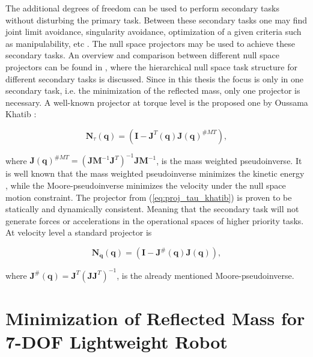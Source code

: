 The additional degrees of freedom can be used to perform secondary tasks without disturbing the primary task. Between these secondary tasks one may find joint limit avoidance, singularity avoidance, optimization of a given criteria such as manipulability, etc  \cite{redundancy_1}. 
The null space projectors may be used to achieve these secondary tasks. An overview and comparison between different null space projectors can be found in \cite{JLA_5}, where the hierarchical null space task structure for different secondary tasks is discussed. Since in this thesis the focus is only in  one secondary task, i.e. the minimization of the reflected mass, only one projector is necessary. 
A well-known projector at torque level is the proposed one by Oussama Khatib \cite{khatib1995}:



\begin{equation}
	\mathbf{N}_{\tau}(\mathbf{q}) = \left(\mathbf{I}-\mathbf{J}^{T}(\mathbf{q})\mathbf{J}(\mathbf{q})^{\#MT}\right),
	\label{eq:proj_tau_khatib}
\end{equation}

where $\mathbf{J}(\mathbf{q})^{\#MT} = (\mathbf{J}\mathbf{ M}^{-1} \mathbf{J}^T)^{-1} \mathbf{J} \mathbf{M}^{-1}$, is the mass weighted pseudoinverse. It is well known that the mass weighted pseudoinverse minimizes the kinetic energy \cite{khatib1995}, while the Moore-pseudoinverse minimizes the velocity under the null space motion constraint. The projector from (\ref{eq:proj_tau_khatib}) is proven to be statically and dynamically consistent. Meaning that the secondary task will not generate forces or accelerations in the operational spaces of higher priority tasks.
At velocity level a standard projector is 

\begin{equation}
\mathbf{N}_{\mathbf{\dot{q}}}(\mathbf{q}) = \left(\mathbf{I}-\mathbf{J}^{\#}(\mathbf{q})\mathbf{J}(\mathbf{q})\right),
\label{eq:proj_dq_khatib}
\end{equation}

where $\mathbf{J}^{\#}(\mathbf{q}) = \mathbf{J}^{T} (\mathbf{J} \mathbf{J}^T)^{-1} $, is the already mentioned Moore-pseudoinverse.




\section{Minimization of Reflected Mass for 7-DOF Lightweight Robot}
\label{sec:control_LWR}

